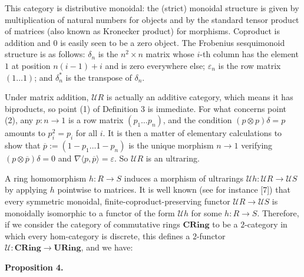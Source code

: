  
 
This category is distributive monoidal: the (strict) monoidal structure is given by multiplication of natural numbers for objects and by the standard tensor product of matrices (also known as Kronecker product) for morphisms. Coproduct is addition and $0$ is easily seen to be a zero object. The Frobenius sesquimonoid structure is as follows: $\delta_{n}$ is the $n^{2}\times n$ matrix whose $i$-th column has the element $1$ at position $n(i-1)+i$ and is zero everywhere else; $\varepsilon_{n}$ is the row matrix $(1\ldots 1)$; and $\delta^{\ast}_{n}$ is the transpose of $\delta_{n}$.\par
 
 
 
Under matrix addition, $\mathcal{U}R$ is actually an additive category, which means it has biproducts, so point (1) of Definition 3 is immediate. For what concerns point (2), any $p:n\to 1$ is a row matrix $(p_{1}\ldots p_{n})$, and the condition $(p\otimes p)\delta=p$ amounts to $p_{i}^{2}=p_{i}$ for all $i$. It is then a matter of elementary calculations to show that $\overline{p}:=(1-p_{1}\ldots 1-p_{n})$ is the unique morphism $n\to 1$ verifying $(p\otimes\overline{p})\delta=0$ and $\nabla\langle p,\overline{p}\rangle=\varepsilon$. So $\mathcal{U}R$ is an ultraring.\par
 
 
 
A ring homomorphism $h:R\to S$ induces a morphism of ultrarings $\mathcal{U}h:\mathcal{U}R\to\mathcal{U}S$ by applying $h$ pointwise to matrices. It is well known (see for instance [7]) that every symmetric monoidal, finite-coproduct-preserving functor $\mathcal{U}R\to\mathcal{U}S$ is monoidally isomorphic to a functor of the form $\mathcal{U}h$ for some $h:R\to S$. Therefore, if we consider the category of commutative rings $\mathbf{CRing}$ to be a $2$-category in which every hom-category is discrete, this defines a $2$-functor $\mathcal{U}:\mathbf{CRing}\to\mathbf{URing}$, and we have:\par
 
 
 
\par\medskip\noindent\textbf{Proposition 4.}\par
 
